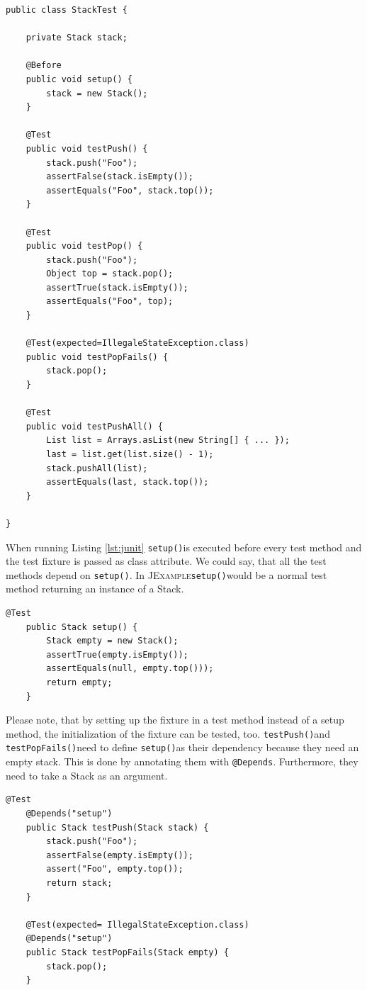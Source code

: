 \documentclass[11pt]{article}
\newcommand{\JUnit}{\textsc{JUnit}\xspace}
\newcommand{\JExample}{\textsc{JExample}\xspace}
\newcommand{\ttt}[1]{\texttt{#1}}
\newcommand{\setup}{\ttt{setup()}}
\newcommand{\testPush}{\ttt{testPush()}}
\newcommand{\testPopFails}{\ttt{testPopFails()}}
\begin{document}
\begin{lstlisting}[label=lst:junit,caption=Conventional \JUnit test case.]
public class StackTest {

    private Stack stack;

    @Before
    public void setup() {
        stack = new Stack();
    }

    @Test
    public void testPush() {
        stack.push("Foo");
        assertFalse(stack.isEmpty());
        assertEquals("Foo", stack.top());
    }

    @Test
    public void testPop() {
        stack.push("Foo");
        Object top = stack.pop();
        assertTrue(stack.isEmpty());
        assertEquals("Foo", top);
    }

    @Test(expected=IllegaleStateException.class)
    public void testPopFails() {
        stack.pop();
    }

    @Test
    public void testPushAll() {
        List list = Arrays.asList(new String[] { ... });
        last = list.get(list.size() - 1);
        stack.pushAll(list);
        assertEquals(last, stack.top());
    }

}
\end{lstlisting}

When running Listing \ref{lst:junit} \setup is executed before every test method and the test fixture is passed as class attribute. We could say, that all the test methods depend on \setup. In \JExample \setup would be a normal test method returning an instance of a Stack.

\begin{lstlisting}[label=lst:setup,caption=Promote fixture to test with return value.]
    @Test
    public Stack setup() {
        Stack empty = new Stack();
        assertTrue(empty.isEmpty());
        assertEquals(null, empty.top()));
        return empty;
    }
\end{lstlisting}

Please note, that by setting up the fixture in a test method instead of a setup method, the initialization of the fixture can be tested, too.
\testPush and \testPopFails need to define \setup as their dependency because they need an empty stack. This is done by annotating them with \ttt{@Depends}. Furthermore, they need to take a Stack as an argument.

\begin{lstlisting}[label=lst:testpush,caption=Take another test's result as input value.]
    @Test
    @Depends("setup")
    public Stack testPush(Stack stack) {
        stack.push("Foo");
        assertFalse(empty.isEmpty());
        assert("Foo", empty.top());
        return stack;
    }

    @Test(expected= IllegalStateException.class)
    @Depends("setup")
    public Stack testPopFails(Stack empty) {
        stack.pop();
    }
\end{lstlisting}
\end{document}
